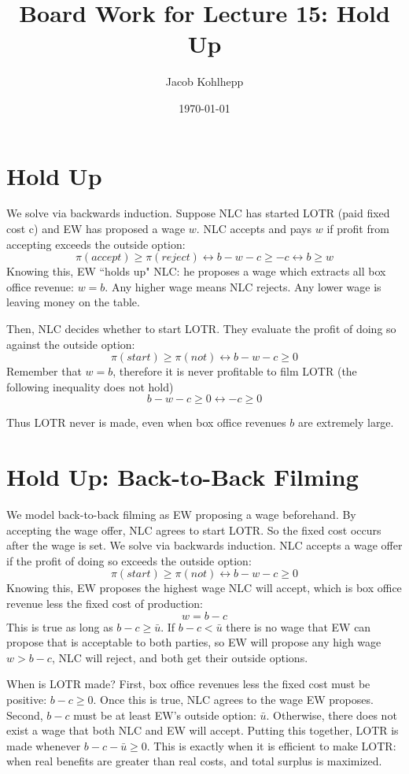 \documentclass{article}
\title{Board Work for Lecture 15: Hold Up}
\author{Jacob Kohlhepp}
\date{\today}
\begin{document}
\maketitle

\section{Hold Up}
%

We solve via backwards induction. Suppose NLC has started LOTR (paid fixed cost c) and EW has proposed a wage $w$. NLC accepts and pays $w$ if profit from accepting exceeds the outside option:
\[ \pi(accept) \geq \pi (reject) \leftrightarrow b-w-c \geq -c \leftrightarrow b \geq w\]
Knowing this, EW ``holds up" NLC: he proposes a wage which extracts all box office revenue: $w=b$. Any higher wage means NLC rejects. Any lower wage is leaving money on the table. 

Then, NLC decides whether to start LOTR. They evaluate the profit of doing so against the outside option:
\[\pi(start) \geq \pi (not) \leftrightarrow  b-w-c \geq 0\]
Remember that $w=b$, therefore it is never profitable to film LOTR (the following inequality does not hold)
\[b-w-c \geq 0 \leftrightarrow -c \geq 0 \]

Thus LOTR never is made, even when box office revenues $b$ are extremely large.

\section{Hold Up: Back-to-Back Filming}
%

We model back-to-back filming as EW proposing a wage beforehand. By accepting the wage offer, NLC agrees to start LOTR. So the fixed cost occurs after the wage is set. We solve via backwards induction. NLC accepts a wage offer if the profit of doing so exceeds the outside option:
\[\pi(start) \geq \pi (not) \leftrightarrow  b-w-c \geq 0\]
Knowing this, EW proposes the highest wage NLC will accept, which is box office revenue less the fixed cost of production:
\[w = b-c\]
This is true as long as $b-c\geq \bar u$. If $b-c<\bar u$ there is no wage that EW can propose that is acceptable to both parties, so EW will propose any high wage $w>b-c$, NLC will reject, and both get their outside options.

When is LOTR made? First, box office revenues less the fixed cost must be positive: $b-c\geq 0$. Once this is true, NLC agrees to the wage EW proposes. Second, $b-c$ must be at least EW's outside option: $\bar u$. Otherwise, there does not exist a wage that both NLC and EW will accept. Putting this together, LOTR is made whenever $b-c-\bar u\geq 0$. This is exactly when it is efficient to make LOTR: when real benefits are greater than real costs, and total surplus is maximized.
\end{document}
